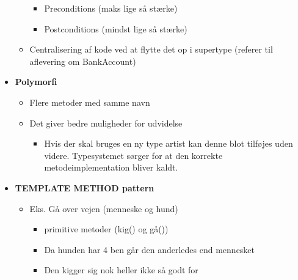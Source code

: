 \begin{itemize}
\begin{itemize}
\begin{itemize}
            \item Preconditions (maks lige så stærke)
            \item Postconditions (mindst lige så stærke)
        \end{itemize}
        
        \item Centralisering af kode ved at flytte det op i supertype (referer til aflevering om BankAccount)
    \end{itemize}
    
    \item \textbf{Polymorfi}
    \begin{itemize}
        \item Flere metoder med samme navn
        
        \item Det giver bedre muligheder for udvidelse
        \begin{itemize}
            \item Hvis der skal bruges en ny type artist kan denne blot tilføjes uden videre. Typesystemet sørger for at den korrekte metodeimplementation bliver kaldt.
        \end{itemize}
    \end{itemize}
    
    \item \textbf{TEMPLATE METHOD pattern}
    \begin{itemize}
        \item Eks. Gå over vejen (menneske og hund)
        \begin{itemize}
            \item primitive metoder (kig() og gå())
            \item Da hunden har 4 ben går den anderledes end mennesket
            \item Den kigger sig nok heller ikke så godt for
        \end{itemize}
    \end{itemize}
\end{itemize}
